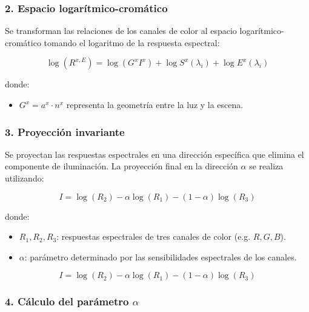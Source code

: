 \subsubsection{2. Espacio logarítmico-cromático}

Se transforman las relaciones de los canales de color al espacio logarítmico-cromático tomando el logaritmo de la respuesta espectral:

$$\log (R^{x,E} )=\log (G^x I^x )+\log S^x (\lambda_i )+\log E^x (\lambda_i )$$

donde:

\begin{itemize}
\setlength{\itemsep}{-1ex}
   \item{\begin{flushleft} $G^x =a^x \cdot n^x$ representa la geometría entre la luz y la escena. \end{flushleft}}
\end{itemize}

\subsubsection{3. Proyección invariante}

Se proyectan las respuestas espectrales en una dirección específica que elimina el componente de iluminación. La proyección final en la dirección $\alpha$ se realiza utilizando:

$$I=\log (R_2 )-\alpha \log (R_1 )-(1-\alpha )\log (R_3 )$$

donde:

\begin{itemize}
\setlength{\itemsep}{-1ex}
   \item{\begin{flushleft} $R_1 ,R_2 ,R_3$: respuestas espectrales de tres canales de color (e.g. $R,G,B$). \end{flushleft}}
   \item{\begin{flushleft} $\alpha$: parámetro determinado por las sensibilidades espectrales de los canales. \end{flushleft}}
\end{itemize}

$$I=\log (R_2 )-\alpha \log (R_1 )-(1-\alpha )\log (R_3 )$$

\subsubsection{4. Cálculo del parámetro $\alpha$}

